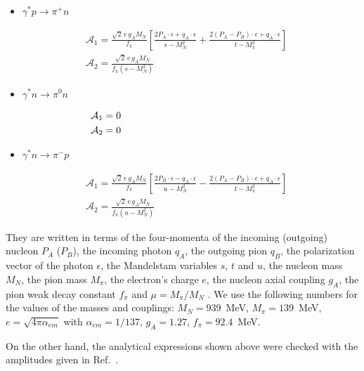 \documentclass[prc,twocolumn,showpacs,preprintnumbers,amsmath,amssymb
,superscriptaddress,a4paper,nofootinbib
]{revtex4-1}
\begin{document}
\begin{itemize}
 \item $\gamma^* p \to \pi^+ n$
\end{itemize}
\begin{align}
  &\mathcal{A}_1= \frac{\sqrt{2}\, e\, g_A M_N}{f_\pi}\left[\frac{2 P_A\cdot \epsilon + q_A\cdot \epsilon}{s-M_N^2} + \frac{2 (P_A - P_B)\cdot \epsilon + q_A\cdot \epsilon}{t-M_\pi^2}\right]\\
   &\mathcal{A}_2=\frac{\sqrt{2}\, e\, g_A M_N}{f_\pi(s-M_N^2)}
\end{align}


\begin{itemize}
 \item $\gamma^* n \to \pi^0 n$
\end{itemize}
\begin{align}
  &\mathcal{A}_1= 0\hspace{5.5cm}\\
   &\mathcal{A}_2=0
\end{align}


\begin{itemize}
 \item $\gamma^* n \to \pi^- p$
\end{itemize}
\begin{align}
  &\mathcal{A}_1= \frac{\sqrt{2}\, e\, g_A M_N}{f_\pi}\left[\frac{2 P_B\cdot \epsilon - q_A\cdot \epsilon}{u-M_N^2}  - \frac{2 (P_A - P_B)\cdot \epsilon + q_A\cdot \epsilon}{t-M_\pi^2}\right]\\
   &\mathcal{A}_2=\frac{\sqrt{2}\, e\, g_A M_N}{f_\pi(u-M_N^2)}
\end{align}







They are written in terms of the four-momenta of the incoming (outgoing) nucleon $P_A$ ($P_B$), the incoming photon $q_A$, the outgoing pion $q_B$, the polarization vector of the photon $\epsilon$, the Mandelstam variables $s$, $t$ and $u$, the nucleon mass $M_N$, the pion mass $M_\pi$, the electron's charge $e$, the nucleon axial coupling $g_A$, the pion weak decay constant $f_\pi$ and $\mu=M_\pi/M_N$ . We use the following numbers for the values of the masses and couplings: $M_N=939$~MeV, $M_\pi=139$~MeV, $e=\sqrt{4\pi \alpha_{em}}$ with $\alpha_{em}=1/137$, $g_A=1.27$, $f_\pi=92.4$~MeV.

On the other hand, the analytical expressions shown above were checked with the amplitudes given in Ref.~\cite{Pasquini:2007fw}.
\end{document}
